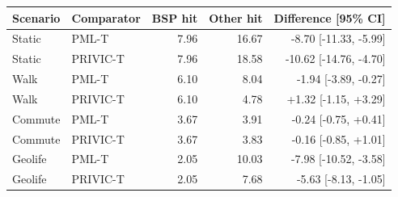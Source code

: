\begin{tabular}{llrrr}
\toprule
Scenario & Comparator & BSP hit & Other hit & Difference [95\% CI] \\
\midrule
Static & PML-T & 7.96 & 16.67 & -8.70 [-11.33, -5.99] \\
Static & PRIVIC-T & 7.96 & 18.58 & -10.62 [-14.76, -4.70] \\
Walk & PML-T & 6.10 & 8.04 & -1.94 [-3.89, -0.27] \\
Walk & PRIVIC-T & 6.10 & 4.78 & +1.32 [-1.15, +3.29] \\
Commute & PML-T & 3.67 & 3.91 & -0.24 [-0.75, +0.41] \\
Commute & PRIVIC-T & 3.67 & 3.83 & -0.16 [-0.85, +1.01] \\
Geolife & PML-T & 2.05 & 10.03 & -7.98 [-10.52, -3.58] \\
Geolife & PRIVIC-T & 2.05 & 7.68 & -5.63 [-8.13, -1.05] \\
\bottomrule
\end{tabular}